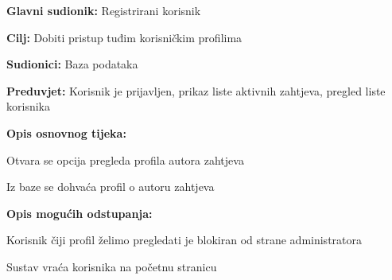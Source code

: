 \noindent {}
\begin{packed_item}
	\item \textbf{Glavni sudionik: } Registrirani korisnik
	\item  \textbf{Cilj:} Dobiti pristup tuđim korisničkim profilima
	\item  \textbf{Sudionici:} Baza podataka
	\item  \textbf{Preduvjet:} Korisnik je prijavljen, prikaz liste aktivnih zahtjeva, pregled liste korisnika
	\item  \textbf{Opis osnovnog tijeka:}
	\item[] \begin{packed_enum}
		\item Otvara se opcija pregleda profila autora zahtjeva
		\item Iz baze se dohvaća profil o autoru zahtjeva
	\end{packed_enum}
	\item  \textbf{Opis mogućih odstupanja:}
	\item[] \begin{packed_item}
		\item[1.a] Korisnik čiji profil želimo pregledati je blokiran od strane administratora
		\item[] \begin{packed_enum}
			\item Sustav vraća korisnika na početnu stranicu
		\end{packed_enum}
	\end{packed_item}
\end{packed_item}

